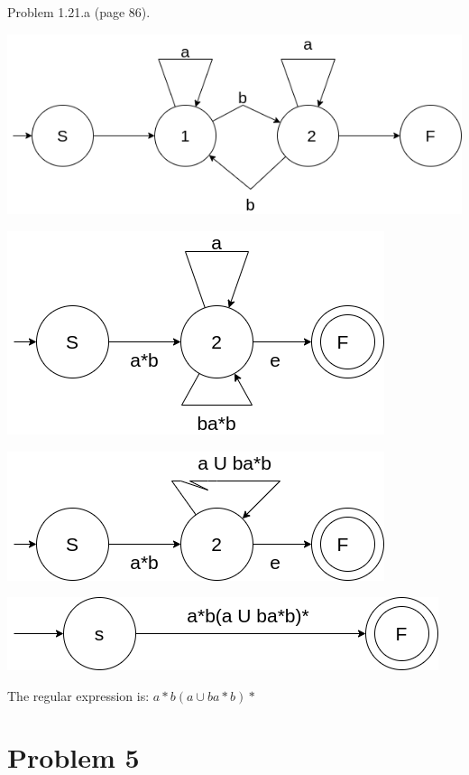 \documentclass[11pt]{article}
\begin{document}
Problem 1.21.a (page 86).
\begin{center}
\includegraphics[scale=0.5]{02/HW02-1.21.a.png} 
\end{center}
\begin{center}
\includegraphics[scale=0.5]{02/HW02-1.21.b.png} 
\end{center}
\begin{center}
\includegraphics[scale=0.5]{02/HW02-1.21.c.png} 
\end{center}
\begin{center}
\includegraphics[scale=0.5]{02/HW02-1.21.d.png} 
\end{center}
The regular expression is: $a*b(a\cup ba*b)*$

\newpage
\section*{Problem 5}
\end{document}
